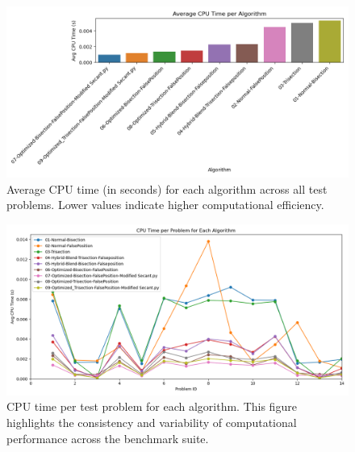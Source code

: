 \documentclass[amsmath, amssymb, aps]{revtex4-2}
\begin{document}
\begin{figure}[H]
    \centering
    \includegraphics[width=0.8\linewidth]{avg_cpu_time_per_algorithm.png}
    \caption{Average CPU time (in seconds) for each algorithm across all test problems. Lower values indicate higher computational efficiency.}
    \label{fig:avg_cpu_time}
\end{figure}

\begin{figure}[H]
    \centering
    \includegraphics[width=0.8\linewidth]{cpu_time_lineplot_per_problem.png}
    \caption{CPU time per test problem for each algorithm. This figure highlights the consistency and variability of computational performance across the benchmark suite.}
    \label{fig:cpu_time_per_problem}
\end{figure}
\end{document}

